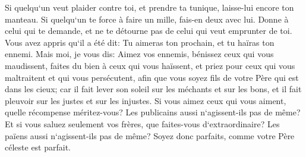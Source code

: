 \verse Si quelqu`un veut plaider contre toi, et prendre ta tunique, laisse-lui encore ton manteau. 
\verse Si quelqu`un te force à faire un mille, fais-en deux avec lui. 
\verse Donne à celui qui te demande, et ne te détourne pas de celui qui veut emprunter de toi. 
\verse Vous avez appris qu`il a été dit: Tu aimeras ton prochain, et tu haïras ton ennemi. 
\verse Mais moi, je vous dis: Aimez vos ennemis, bénissez ceux qui vous maudissent, faites du bien à ceux qui vous haïssent, et priez pour ceux qui vous maltraitent et qui vous persécutent, 
\verse afin que vous soyez fils de votre Père qui est dans les cieux; car il fait lever son soleil sur les méchants et sur les bons, et il fait pleuvoir sur les justes et sur les injustes. 
\verse Si vous aimez ceux qui vous aiment, quelle récompense méritez-vous? Les publicains aussi n`agissent-ils pas de même? 
\verse Et si vous saluez seulement vos frères, que faites-vous d`extraordinaire? Les païens aussi n`agissent-ils pas de même? 
\verse Soyez donc parfaits, comme votre Père céleste est parfait. 

\chapter{}

